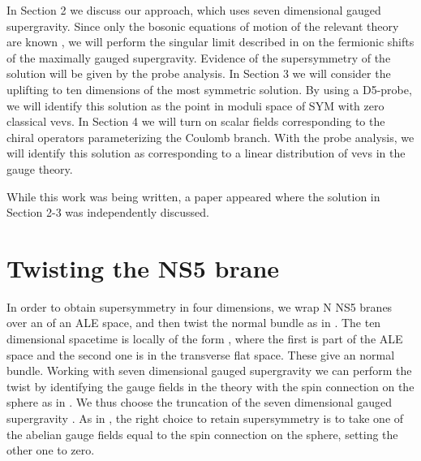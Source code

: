 \documentclass[a4paper,12pt]{article}
\begin{document}
In Section 2 we discuss our approach, which uses seven dimensional gauged 
supergravity. Since only the bosonic equations of motion of the
relevant theory are known \cite{cve1}, we will perform the singular
limit described in \cite{cve2} on the fermionic shifts of the
maximally gauged supergravity. Evidence
of the \coordHE{} 
supersymmetry of the solution will be given by the probe analysis.
In Section 3 we will consider the uplifting to ten dimensions of
the most symmetric solution. By using a D5-probe, we will identify 
this solution as the point in moduli space
of \coordHE{} SYM with zero classical vevs. 
In Section 4 we will turn on scalar fields
corresponding to the chiral operators parameterizing the
Coulomb branch. With
the probe analysis, we will identify this solution as corresponding 
to a linear distribution of vevs in the gauge theory.

While this work was being written, a paper \cite{martelli} appeared
where the solution in Section 2-3 was independently discussed.   

\section{Twisting the NS5 brane}
In order to obtain \coordHE{} supersymmetry in four dimensions, we wrap N NS5
branes over an \coordHE{} of an ALE space, and then  twist the normal bundle as in \cite{vafa}.
The ten dimensional spacetime is locally of the form \coordHE{}, where the first \coordHE{} is part of the ALE space and the second one is in the transverse flat space. These give
an \coordHE{} normal bundle. Working with seven dimensional gauged supergravity we can perform the twist by identifying the gauge fields in the theory
with the spin connection on the sphere as in \cite{mn1,mn2}. 
We thus choose the \coordHE{} truncation \cite{minasian} of the \coordHE{} seven dimensional gauged supergravity \cite{pernici}.
As in \cite{mn1}, the right choice to retain \coordHE{} supersymmetry is
to take one of the abelian gauge fields equal to the spin connection on the sphere, setting the other one to zero.
\end{document}
